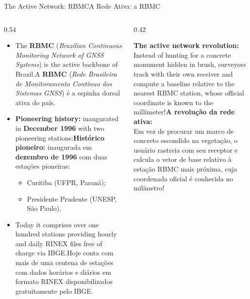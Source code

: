 \documentclass[aspectratio=169,11pt]{beamer}
\newcommand{\tr}[2]{\ifEN#2\else#1\fi}
\newcommand{\bnum}[1]{\ifmmode\textcolor{mTeal}{\mathbf{#1}}\else\textbf{\textcolor{mTeal}{#1}}\fi}
\begin{document}
\begin{frame}{\tr{A Rede Ativa: a RBMC}{The Active Network: RBMC}}
  \begin{columns}[onlytextwidth]
    \begin{column}{0.54\textwidth}
      \begin{itemize}
        \setlength{\itemsep}{4pt}
        \scriptsize
        \item \tr{A \textbf{RBMC} (\emph{Rede Brasileira de Monitoramento Contínuo dos Sistemas GNSS})
              é a espinha dorsal ativa do país.}{The \textbf{RBMC} (\emph{Brazilian Continuous
              Monitoring Network of GNSS Systems}) is the active backbone of Brazil.}
        \item \tr{\textbf{Histórico pioneiro:} inaugurada em \bnum{dezembro de 1996} com duas
              estações pioneiras:}{
              \textbf{Pioneering history:} inaugurated in \bnum{December 1996} with two pioneering
              stations:}
              \begin{itemize}
                \tiny
                \item Curitiba (UFPR, Paraná);
                \item Presidente Prudente (UNESP, São Paulo).
              \end{itemize}
        \item \tr{Hoje conta com mais de uma centena de estações com dados horários e diários em
              formato RINEX disponibilizados gratuitamente pelo IBGE.}{Today it comprises over one
              hundred stations providing hourly and daily RINEX files free of charge via IBGE.}
      \end{itemize}
    \end{column}
    \begin{column}{0.42\textwidth}
      \begin{ideia}
        \scriptsize
        \tr{\textbf{A revolução da rede ativa:}\\[3pt]
        Em vez de procurar um marco de concreto escondido na vegetação, o usuário rastreia com seu
        receptor e calcula o vetor de base relativo à estação RBMC mais próxima, cuja coordenada
        oficial é conhecida no milímetro!}{\textbf{The active network revolution:}\\[3pt]
        Instead of hunting for a concrete monument hidden in brush, surveyors track with their own
        receiver and compute a baseline relative to the nearest RBMC station, whose official
        coordinate is known to the millimeter!}
      \end{ideia}
    \end{column}
  \end{columns}
\end{frame}
\end{document}
